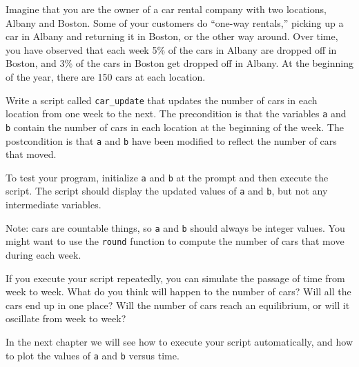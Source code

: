 \begin{ex}
\label{cargame}

Imagine that you are the owner of a car rental company with two
locations, Albany and Boston. Some of your customers do ``one-way
rentals,'' picking up a car in Albany and returning it in Boston, or
the other way around. Over time, you have observed that each week 5\%
of the cars in Albany are dropped off in Boston, and 3\% of the cars
in Boston get dropped off in Albany.
At the beginning of the year, there are 150 cars at each location.

Write a script called {\tt car\_update} that updates the number
of cars in each location from one week to the next. The precondition
is that the variables {\tt a} and {\tt b} contain the number of cars
in each location at the beginning of the week. The postcondition
is that {\tt a} and {\tt b} have been modified to reflect the number
of cars that moved.

To test your program, initialize {\tt a} and {\tt b} at
the prompt and then execute the script. The script should display
the updated values of {\tt a} and {\tt b}, but not any intermediate
variables.

Note: cars are countable things, so {\tt a} and {\tt b} should always
be integer values. You might want to use the {\tt round} function
to compute the number of cars that move during each week.

If you execute your script repeatedly, you can simulate the passage
of time from week to week. What do you think will happen to the
number of cars? Will all the cars end up in one place? Will the
number of cars reach an equilibrium, or will it oscillate from week
to week?

In the next chapter we will see how to execute your script automatically,
and how to plot the values of {\tt a} and {\tt b} versus time.
\end{ex}

